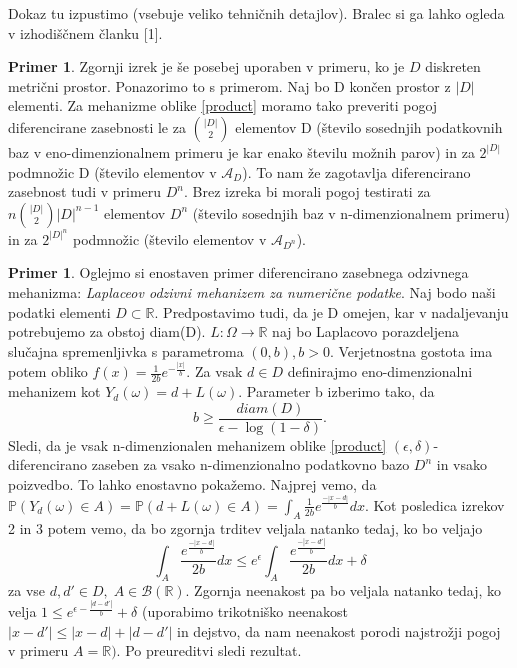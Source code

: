 \documentclass[12pt,a4paper]{amsart}
\theoremstyle{definition} %
\newtheorem{primer}[definicija]{Primer}
\theoremstyle{plain} %
\begin{document}
Dokaz tu izpustimo (vsebuje veliko tehničnih detajlov). Bralec si ga lahko ogleda v izhodiščnem članku [1].
\newline
\newline
\begin{primer} Zgornji izrek je še posebej uporaben v primeru, ko je $D$ diskreten metrični prostor. Ponazorimo to s primerom. Naj bo D končen prostor z $|D|$ elementi. Za mehanizme oblike \eqref{product} moramo tako preveriti pogoj diferencirane zasebnosti le za $\binom{|D|}{2}$ elementov D (število sosednjih podatkovnih baz v eno-dimenzionalnem primeru je kar enako številu možnih parov) in za $2^{|D|}$ podmnožic D (število elementov v $\mathcal{A}_D$). To nam že zagotavlja diferencirano zasebnost tudi v primeru $D^n$.  Brez izreka bi morali pogoj testirati za $n\binom{|D|}{2}|D|^{n-1}$ elementov $D^n$ (število sosednjih baz v n-dimenzionalnem primeru) in za $2^{|D|^n}$ podmnožic (število elementov v $\mathcal{A}_{D^n}$).
\end{primer}
\begin{primer}  Oglejmo si enostaven primer diferencirano zasebnega odzivnega mehanizma: \textit{Laplaceov odzivni mehanizem za numerične podatke}. Naj bodo naši podatki elementi $D \subset \mathbb{R}$. Predpostavimo tudi, da je D omejen, kar v nadaljevanju potrebujemo za obstoj diam(D). $L: \Omega \rightarrow \mathbb{R}$ naj bo Laplacovo porazdeljena slučajna spremenljivka s parametroma $(0,b), b > 0$.  
Verjetnostna gostota ima potem obliko $f(x)=\frac{1}{2b}e^{-\frac{|x|}{b}}$.  Za vsak $d \in D$ definirajmo eno-dimenzionalni mehanizem kot  $Y_{d}(\omega) = d + L(\omega)$. Parameter b izberimo tako, da 
$$b\geq \frac{diam(D)}{\epsilon - \log(1-\delta)}.$$
Sledi, da je vsak n-dimenzionalen mehanizem oblike \eqref{product} $(\epsilon, \delta)$-diferencirano zaseben za vsako n-dimenzionalno podatkovno bazo $D^n$ in vsako poizvedbo. To lahko enostavno pokažemo. 
\newline
\newline
Najprej vemo, da $\mathbb{P}(Y_{d}(\omega) \in A) = \mathbb{P}(d + L(\omega) \in A) = \int_{A}\frac{1}{2b}e^{\frac{-|x-d|}{b}}dx$. Kot posledica izrekov 2 in 3 potem vemo, da bo zgornja trditev veljala natanko tedaj, ko bo veljajo 
$$\int_{A}\frac{e^{\frac{-|x-d|}{b}}}{2b}dx \leq e^{\epsilon}\int_{A}\frac{e^{\frac{-|x-d'|}{b}}}{2b}dx + \delta$$
za vse $d,d' \in D, \; A \in \mathcal{B}(\mathbb{R})$. Zgornja neenakost pa bo veljala natanko tedaj, ko velja $1 \leq e^{\epsilon - \frac{|d-d'|}{b}} + \delta$ (uporabimo trikotniško neenakost $|x-d'| \leq |x-d| + |d -d'|$ in dejstvo, da nam neenakost porodi najstrožji pogoj v primeru $A=\mathbb{R})$. Po preureditvi sledi rezultat. 
\end{primer}
\end{document}
